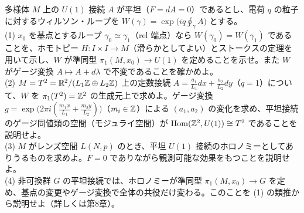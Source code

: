 \begin{problem}[難易度 C]\label{ch02-prob-wilson}
多様体 $M$ 上の $U(1)$ 接続 $A$ が平坦（$F=dA=0$）であるとし、電荷 $q$ の粒子に対するウィルソン・ループを $W(\gamma)=\exp\bigl(iq\oint_\gamma A\bigr)$ とする。\\
(1) $x_0$ を基点とするループ $\gamma_0\simeq\gamma_1$（rel 端点）なら $W(\gamma_0)=W(\gamma_1)$ であることを、ホモトピー $H\colon I\times I\to M$（滑らかとしてよい）とストークスの定理を用いて示し、$W$ が準同型 $\pi_1(M,x_0)\to U(1)$ を定めることを示せ。また $W$ がゲージ変換 $A\mapsto A+d\lambda$ で不変であることを確かめよ。\\
(2) $M=T^2=\mathbb{R}^2/(L_1\mathbb{Z}\oplus L_2\mathbb{Z})$ 上の定数接続 $A=\frac{a_1}{L_1}dx+\frac{a_2}{L_2}dy$（$q=1$）について、$W$ を $\pi_1(T^2)=\mathbb{Z}^2$ の生成元上で求めよ。ゲージ変換 $g=\exp\bigl(2\pi i(\tfrac{m_1x}{L_1}+\tfrac{m_2y}{L_2})\bigr)$（$m_i\in\mathbb{Z}$）による $(a_1,a_2)$ の変化を求め、平坦接続のゲージ同値類の空間（モジュライ空間）が $\mathrm{Hom}(\mathbb{Z}^2,U(1))\cong T^2$ であることを説明せよ。\\
(3) $M$ がレンズ空間 $L(N,p)$ のとき、平坦 $U(1)$ 接続のホロノミーとしてありうるものを求めよ。$F=0$ でありながら観測可能な効果をもつことを説明せよ。\\
(4) 非可換群 $G$ の平坦接続では、ホロノミーが準同型 $\pi_1(M,x_0)\to G$ を定め、基点の変更やゲージ変換で全体の共役だけ変わる。このことを (1) の類推から説明せよ（詳しくは第8章）。
\end{problem}

